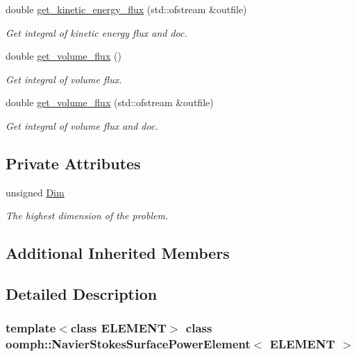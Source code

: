 \begin{DoxyCompactItemize}
double \hyperlink{classoomph_1_1NavierStokesSurfacePowerElement_a1d2f901cf1ce20919aad222a013210b4}{get\+\_\+kinetic\+\_\+energy\+\_\+flux} (std\+::ofstream \&outfile)
\begin{DoxyCompactList}\small\item\em Get integral of kinetic energy flux and doc. \end{DoxyCompactList}\item 
double \hyperlink{classoomph_1_1NavierStokesSurfacePowerElement_ad30a10d36ecfaebe0add91c0750e52f7}{get\+\_\+volume\+\_\+flux} ()
\begin{DoxyCompactList}\small\item\em Get integral of volume flux. \end{DoxyCompactList}\item 
double \hyperlink{classoomph_1_1NavierStokesSurfacePowerElement_a9ec3d84951b67c1b84827b2a721c06b8}{get\+\_\+volume\+\_\+flux} (std\+::ofstream \&outfile)
\begin{DoxyCompactList}\small\item\em Get integral of volume flux and doc. \end{DoxyCompactList}\end{DoxyCompactItemize}
\subsection*{Private Attributes}
\begin{DoxyCompactItemize}
\item 
unsigned \hyperlink{classoomph_1_1NavierStokesSurfacePowerElement_a233c38a6ae3484b4c5b06f7c7b087658}{Dim}
\begin{DoxyCompactList}\small\item\em The highest dimension of the problem. \end{DoxyCompactList}\end{DoxyCompactItemize}
\subsection*{Additional Inherited Members}


\subsection{Detailed Description}
\subsubsection*{template$<$class E\+L\+E\+M\+E\+NT$>$\newline
class oomph\+::\+Navier\+Stokes\+Surface\+Power\+Element$<$ E\+L\+E\+M\+E\+N\+T $>$}

